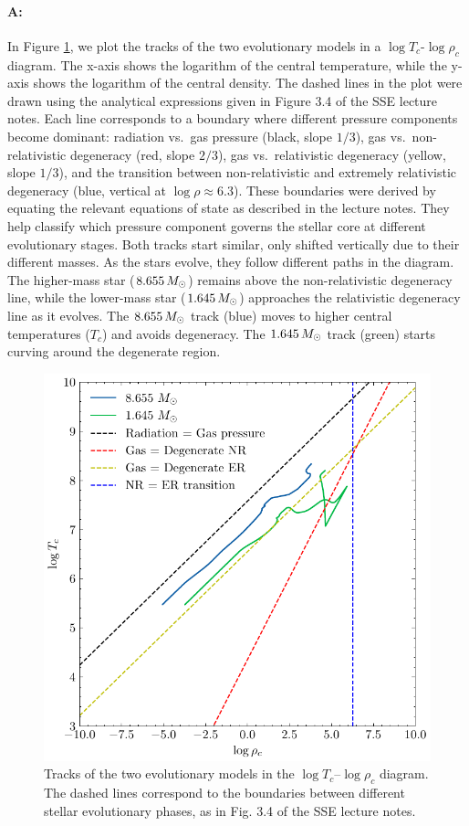 \documentclass[twocolumn,fontsize=11pt]{scrartcl}
\begin{document}
\paragraph{A:} In Figure \ref{fig:q24_deg}, we plot the tracks of the two evolutionary models in a \(\log T_c\)-\(\log \rho_c\) diagram. The x-axis shows the logarithm of the central temperature, while the y-axis shows the logarithm of the central density. The dashed lines in the plot were drawn using the analytical expressions given in Figure 3.4 of the SSE lecture notes. Each line corresponds to a boundary where different pressure components become dominant: radiation vs.\ gas pressure (black, slope \(1/3\)), gas vs.\ non-relativistic degeneracy (red, slope \(2/3\)), gas vs.\ relativistic degeneracy (yellow, slope \(1/3\)), and the transition between non-relativistic and extremely relativistic degeneracy (blue, vertical at \(\log \rho \approx 6.3\)).  These boundaries were derived by equating the relevant equations of state as described in the lecture notes. They help classify which pressure component governs the stellar core at different evolutionary stages. Both tracks start similar, only shifted vertically due to their different masses. As the stars evolve, they follow different paths in the diagram. The higher-mass star (\(8.655\,M_\odot\)) remains above the non-relativistic degeneracy line, while the lower-mass star (\(1.645\,M_\odot\)) approaches the relativistic degeneracy line as it evolves.
The $8.655\,M_\odot$ track (blue) moves to higher central temperatures ($T_c$) and avoids degeneracy. The $1.645\,M_\odot$ track (green) starts curving around the degenerate region.

\begin{figure}[p]
    \centering
    \includegraphics{q24_deg.pdf}
    \caption{Tracks of the two evolutionary models in the \(\log T_c\)–\(\log \rho_c\) diagram. The dashed lines correspond to the boundaries between different stellar evolutionary phases, as in Fig. 3.4 of the SSE lecture notes.}
    \label{fig:q24_deg}
\end{figure}

\printbibliography
\end{document}
